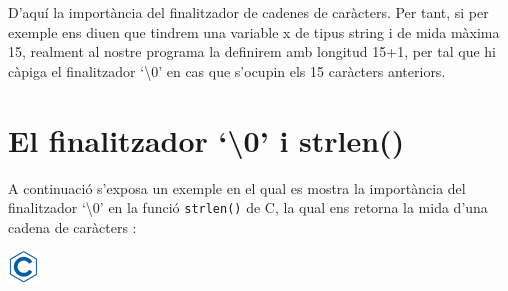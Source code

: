 \documentclass[]{book}
\begin{document}
D'aquí la importància del finalitzador de cadenes de caràcters. Per tant, si per exemple ens diuen que tindrem una variable x de tipus string i de mida màxima 15, realment al nostre programa la definirem amb longitud 15+1, per tal que hi càpiga el finalitzador `\textbackslash0' en cas que s'ocupin els 15 caràcters anteriors.

\hypertarget{el-finalitzador-0-i-strlen}{%
\section{El finalitzador `\textbackslash0' i strlen()}\label{el-finalitzador-0-i-strlen}}

A continuació s'exposa un exemple en el qual es mostra la importància del finalitzador `\textbackslash0' en la funció \texttt{strlen()} de C, la qual ens retorna la mida d'una cadena de caràcters :

\includegraphics{./img/c.png}
\end{document}
